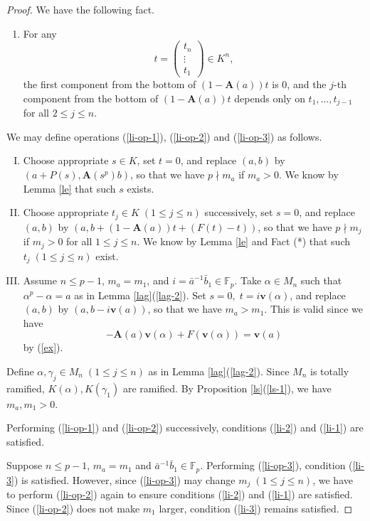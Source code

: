 \documentclass[sn-mathphys-num]{sn-jnl}
\numberwithin{equation}{section}
\theoremstyle{plain}
\theoremstyle{definition}
\begin{document}
\begin{proof}
  We have the following fact.
  
  \begin{enumerate}
  \item For any
  \begin{equation}
t=\begin{pmatrix}
t_n\\
\vdots\\
t_1
\end{pmatrix}\in K^n,
\end{equation}
  the first component from the bottom of $(1-\mathbf{A}(a))t$ is $0$, and the $j$-th component from the bottom of $(1-\mathbf{A}(a))t$ depends only on $t_1,\ldots,t_{j-1}$ for all $2\leq j\leq n$.
  \end{enumerate}
  We may define operations (\ref{li-op-1}), (\ref{li-op-2}) and (\ref{li-op-3}) as follows.
\begin{enumerate}[(I)]
\item\label{li-op-1} Choose appropriate $s\in K$, set $t=0$, and replace $(a,b)$ by $(a+P(s), \mathbf{A}({s}^p)b)$, so that we have $p\nmid m_a$ if $m_a>0$. We know by Lemma \ref{le} that such $s$ exists.
\item\label{li-op-2} Choose appropriate $t_j\in K\;(1\leq j\leq n)$ successively, set $s=0$, and replace $(a,b)$ by $(a,b+(1-\mathbf{A}(a))t+(F(t)-t))$, so that we have $p\nmid m_j$ if $m_j>0$ for all $1\leq j\leq n$. We know by Lemma \ref{le} and Fact (*) that such $t_j\;(1\leq j\leq n)$ exist.
\item\label{li-op-3} Assume $n\leq p-1$, $m_a=m_1$, and $i=\bar{a}^{-1}\bar{b}_1\in\mathbb{F}_p$. Take $\alpha\in M_n$ such that $\alpha^p-\alpha=a$ as in Lemma \ref{lag}(\ref{lag-2}). Set $s=0,\;t=i\mathbf{v}(\alpha)$, and replace $(a,b)$ by $(a,b-i\mathbf{v}(a))$, so that we have $m_a> m_1$. This is valid since we have
  \begin{equation}
    -\mathbf{A}(a)\mathbf{v}(\alpha)+F(\mathbf{v}(\alpha))=\mathbf{v}(a)
  \end{equation}
  by (\ref{ex}).
\end{enumerate}
  

Define $\alpha, \gamma_j\in M_n\;(1\leq j\leq n)$ as in Lemma \ref{lag}(\ref{lag-2}). Since $M_n$ is totally ramified, $K(\alpha),K(\gamma_1)$ are ramified. By Proposition \ref{ls}(\ref{ls-1}), we have $m_a,m_1>0$.

Performing (\ref{li-op-1}) and (\ref{li-op-2}) successively, conditions (\ref{li-2}) and (\ref{li-1}) are satisfied.

Suppose $n\leq p-1$, $m_a=m_1$ and $\bar{a}^{-1}\bar{b}_1\in\mathbb{F}_p$. Performing (\ref{li-op-3}), condition (\ref{li-3}) is satisfied. However, since (\ref{li-op-3}) may change $m_j\;(1\leq j\leq n)$, we have to perform (\ref{li-op-2}) again to ensure conditions (\ref{li-2}) and (\ref{li-1}) are satisfied. Since (\ref{li-op-2}) does not make $m_1$ larger, condition (\ref{li-3}) remains satisfied.  
\end{proof}
\end{document}
